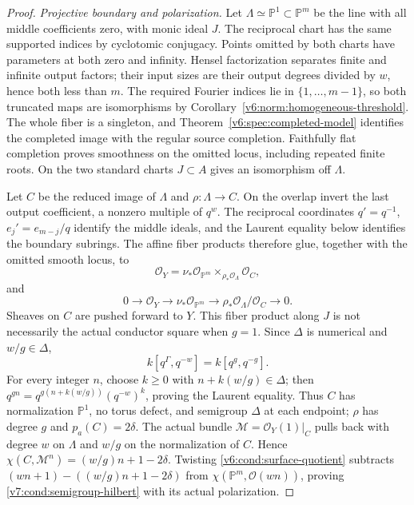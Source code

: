 \documentclass[10pt,fleqn]{article}
\numberwithin{equation}{section}
\newcommand{\PP}{\mathbb P}
\begin{document}
\begin{proof}
\emph{Projective boundary and polarization.}
Let $\Lambda\simeq\PP^1\subset\PP^m$ be the line with all middle
coefficients zero, with monic ideal $J$.  The reciprocal chart has
the same supported indices by cyclotomic conjugacy.  Points omitted by
both charts have parameters at both zero and infinity.  Hensel
factorization separates finite and infinite output factors; their
input sizes are their output degrees divided by $w$, hence both less
than $m$.  The required Fourier indices lie in $\{1,\ldots,m-1\}$,
so both truncated maps are isomorphisms by
Corollary~\ref{v6:norm:homogeneous-threshold}.  The whole fiber is a
singleton, and Theorem~\ref{v6:spec:completed-model} identifies the
completed image with the regular source completion.  Faithfully flat
completion proves smoothness on the omitted locus, including repeated
finite roots.  On the two standard charts $J\subset A$ gives an
isomorphism off $\Lambda$.

Let $C$ be the reduced image of $\Lambda$ and $\rho:\Lambda\to C$.
On the overlap invert the last output coefficient, a nonzero multiple
of $q^w$.  The reciprocal coordinates $q'=q^{-1}$,
$e_j'=e_{m-j}/q$ identify the middle ideals, and the Laurent equality
below identifies the boundary subrings.  The affine fiber products
therefore glue, together with the omitted smooth locus, to
\begin{equation}\label{v6:cond:surface-fiberproduct}
 \mathcal O_Y=\nu_*\mathcal O_{\PP^m}
       \mathop{\times}_{\rho_*\mathcal O_\Lambda}\mathcal O_C,
\end{equation}
and
\begin{equation}\label{v6:cond:surface-quotient}
 0\longrightarrow\mathcal O_Y\longrightarrow\nu_*\mathcal O_{\PP^m}
 \longrightarrow\rho_*\mathcal O_\Lambda/\mathcal O_C\longrightarrow0.
\end{equation}
Sheaves on $C$ are pushed forward to $Y$.  This fiber product along
$J$ is not necessarily the actual conductor square when $g=1$.
Since $\Delta$ is numerical and $w/g\in\Delta$,
\[
 k[q^\Gamma,q^{-w}]=k[q^g,q^{-g}].
\]
For every integer $n$, choose $k\ge0$ with $n+k(w/g)\in\Delta$;
then $q^{gn}=q^{g(n+k(w/g))}(q^{-w})^k$, proving the Laurent equality.
Thus $C$ has normalization $\PP^1$, no torus defect, and semigroup
$\Delta$ at each endpoint; $\rho$ has degree $g$ and $p_a(C)=2\delta$.
The actual bundle $\mathcal M=\mathcal O_Y(1)|_C$ pulls back with
degree $w$ on $\Lambda$ and $w/g$ on the normalization of $C$.
Hence $\chi(C,\mathcal M^n)=(w/g)n+1-2\delta$.
Twisting \eqref{v6:cond:surface-quotient} subtracts
$(wn+1)-((w/g)n+1-2\delta)$ from
$\chi(\PP^m,\mathcal O(wn))$, proving
\eqref{v7:cond:semigroup-hilbert} with its actual polarization.


\end{proof}
\end{document}
